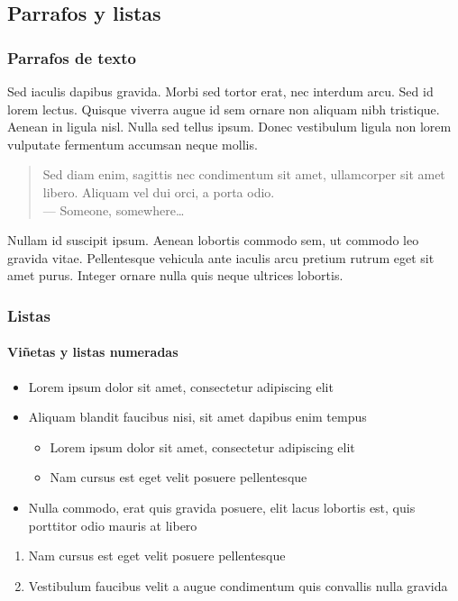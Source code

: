 \documentclass[
	11pt, %
	aspectratio=169, %
]{beamer}
\begin{document}

\subsection{Parrafos y listas}

\begin{frame}
	\frametitle{Parrafos de texto}
	
	Sed iaculis \alert{dapibus gravida}. Morbi sed tortor erat, nec interdum arcu. Sed id lorem lectus. Quisque viverra augue id sem ornare non aliquam nibh tristique. Aenean in ligula nisl. Nulla sed tellus ipsum. Donec vestibulum ligula non lorem vulputate fermentum accumsan neque mollis.
	
	\bigskip %
	
	\begin{quote}
		Sed diam enim, sagittis nec condimentum sit amet, ullamcorper sit amet libero. Aliquam vel dui orci, a porta odio.\\
		--- Someone, somewhere\ldots
	\end{quote}
	
	\bigskip %
	
	Nullam id suscipit ipsum. Aenean lobortis commodo sem, ut commodo leo gravida vitae. Pellentesque vehicula ante iaculis arcu pretium rutrum eget sit amet purus. Integer ornare nulla quis neque ultrices lobortis.
\end{frame}


\begin{frame}
	\frametitle{Listas}
	\framesubtitle{Viñetas y listas numeradas} %
	
	\begin{itemize}
		\item Lorem ipsum dolor sit amet, consectetur adipiscing elit
		\item Aliquam blandit faucibus nisi, sit amet dapibus enim tempus
		\begin{itemize}
			\item Lorem ipsum dolor sit amet, consectetur adipiscing elit
			\item Nam cursus est eget velit posuere pellentesque
		\end{itemize}
		\item Nulla commodo, erat quis gravida posuere, elit lacus lobortis est, quis porttitor odio mauris at libero
	\end{itemize}
	
	\bigskip %
	
	\begin{enumerate}
		\item Nam cursus est eget velit posuere pellentesque
		\item Vestibulum faucibus velit a augue condimentum quis convallis nulla gravida 
	\end{enumerate}
\end{frame}
\end{document}
